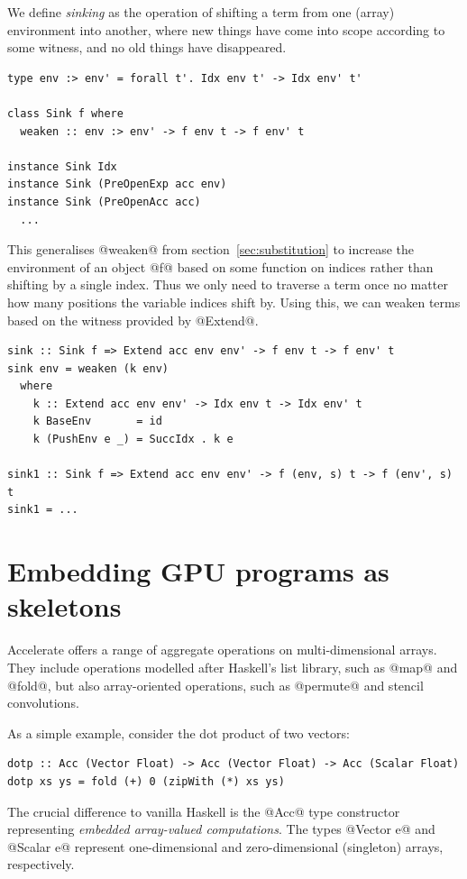 We define \emph{sinking} as the operation of shifting a term from one (array)
environment into another, where new things have come into scope according to
some witness, and no old things have disappeared.
%
\begin{lstlisting}[style=haskell,
    name=sinking,
    caption={Sinking terms to a larger environment}]
type env :> env' = forall t'. Idx env t' -> Idx env' t'

class Sink f where
  weaken :: env :> env' -> f env t -> f env' t

instance Sink Idx
instance Sink (PreOpenExp acc env)
instance Sink (PreOpenAcc acc)
  ...
\end{lstlisting}
%
This generalises @weaken@ from section~\ref{sec:substitution} to increase
the environment of an object @f@ based on some function on indices rather
than shifting by a single  index. Thus we only need to
traverse a term once no matter how many positions the variable indices shift by.
Using this, we can weaken terms based on the witness provided by
@Extend@.
%
\begin{lstlisting}[style=haskell,name=sinking]
sink :: Sink f => Extend acc env env' -> f env t -> f env' t
sink env = weaken (k env)
  where
    k :: Extend acc env env' -> Idx env t -> Idx env' t
    k BaseEnv       = id
    k (PushEnv e _) = SuccIdx . k e

sink1 :: Sink f => Extend acc env env' -> f (env, s) t -> f (env', s) t
sink1 = ...
\end{lstlisting}


\section{Embedding GPU programs as skeletons}
\label{sec:code_generation}

Accelerate offers a range of aggregate operations on multi-dimensional arrays.
They include operations modelled after Haskell's list library, such as
@map@ and @fold@, but also array-oriented operations, such as
@permute@ and stencil convolutions.

As a simple example, consider the dot product of two vectors:
%
\begin{lstlisting}[style=haskell]
dotp :: Acc (Vector Float) -> Acc (Vector Float) -> Acc (Scalar Float)
dotp xs ys = fold (+) 0 (zipWith (*) xs ys)
\end{lstlisting}
%
The crucial difference to vanilla Haskell is the @Acc@ type constructor
representing \emph{embedded array-valued computations}. The types
@Vector e@ and @Scalar e@ represent one-dimensional and
zero-dimensional (singleton) arrays, respectively.

